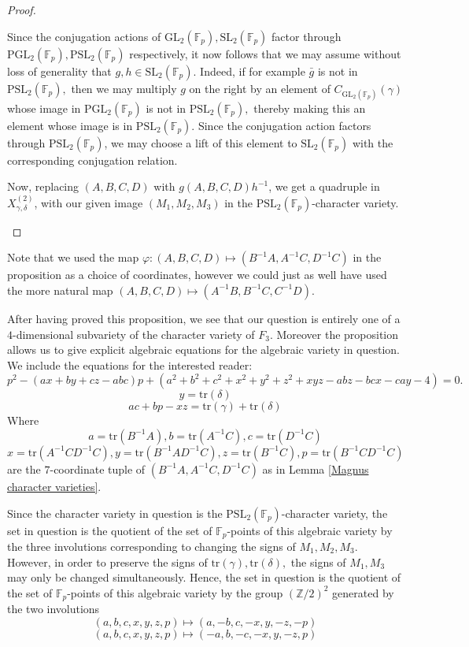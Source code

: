 \documentclass[letterpaper]{amsart}
\begin{document}
\begin{proof}
\begin{enumerate}
    Since the conjugation actions of $\mathrm{GL}_2(\mathbb{F}_p), \mathrm{SL}_2(\mathbb{F}_p)$ factor through $\mathrm{PGL}_2(\mathbb{F}_p), \mathrm{PSL}_2(\mathbb{F}_p)$ respectively, it now follows that we may assume without loss of generality that $g, h \in \mathrm{SL}_2(\mathbb{F}_p).$ Indeed, if for example $\bar{g}$ is not in $\mathrm{PSL}_2(\mathbb{F}_p),$ then we may multiply $g$ on the right by an element of $C_{\mathrm{GL}_2(\mathbb{F}_p)}(\gamma)$ whose image in $\mathrm{PGL}_2(\mathbb{F}_p)$ is not in $\mathrm{PSL}_2(\mathbb{F}_p),$ thereby making this an element whose image is in $\mathrm{PSL}_2(\mathbb{F}_p).$ Since the conjugation action factors through $\mathrm{PSL}_2(\mathbb{F}_p)$, we may choose a lift of this element to $\mathrm{SL}_2(\mathbb{F}_p)$ with the corresponding conjugation relation.

    Now, replacing $(A, B, C, D)$  with $g(A, B, C, D)h^{-1}$, we get a quadruple in $X_{\gamma,\delta}^{(2)}$, with our given image $(M_1,M_2,M_3)$ in the $\mathrm{PSL}_2(\mathbb{F}_p)$-character variety.
    \end{enumerate}
\end{proof}
Note that we used the map $\varphi:(A,B,C,D) \mapsto (B^{-1}A, A^{-1}C, D^{-1}C)$ in the proposition as a choice of coordinates, however we could just as well have used the more natural map $(A,B,C,D) \mapsto (A^{-1}B, B^{-1}C, C^{-1}D)$.

After having proved this proposition, we see that our question is entirely one of a $4$-dimensional subvariety of the character variety of $F_3$. Moreover the proposition allows us to give explicit algebraic equations for the algebraic variety in question. We include the equations for the interested reader:
    $$p^2 - (ax+by+cz - abc)p + (a^2 + b^2 + c^2 + x^2 + y^2 + z^2 + xyz - abz - bcx - cay - 4) = 0.$$
    $$y = \mathrm{tr}(\delta)$$
    $$ac + bp - xz = \mathrm{tr}(\gamma) + \mathrm{tr}(\delta)$$
    Where
    $$a = \mathrm{tr}(B^{-1}A), b=\mathrm{tr}(A^{-1}C), c = \mathrm{tr}(D^{-1}C)$$
    $$x = \mathrm{tr}(A^{-1}CD^{-1}C), y = \mathrm{tr}(B^{-1}AD^{-1}C), z = \mathrm{tr}(B^{-1}C), p = \mathrm{tr}(B^{-1}CD^{-1}C)$$
    are the $7$-coordinate tuple of $(B^{-1}A, A^{-1}C, D^{-1}C)$ as in Lemma \ref{Magnus character varieties}.

Since the character variety in question is the $\mathrm{PSL}_2(\mathbb{F}_p)$-character variety, the set in question is the quotient of the set of $\mathbb{F}_p$-points of this algebraic variety by the three involutions corresponding to changing the signs of $M_1, M_2, M_3.$ However, in order to preserve the signs of $\mathrm{tr}(\gamma), \mathrm{tr}(\delta),$ the signs of $M_1, M_3$ may only be changed simultaneously. Hence, the set in question is the quotient of the set of $\mathbb{F}_p$-points of this algebraic variety by the group $(\mathbb{Z}/2)^2$ generated by the two involutions
$$(a, b, c, x, y, z, p) \mapsto (a, -b, c, -x, y, -z, -p)$$
$$(a, b, c, x, y, z, p) \mapsto (-a, b, -c, -x, y, -z, p)$$
\end{document}
